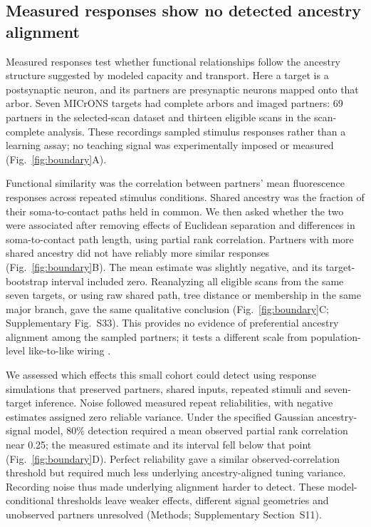 \documentclass[11pt]{article}
\begin{document}
\subsection*{Measured responses show no detected ancestry alignment}

Measured responses test whether functional relationships follow the ancestry structure suggested by modeled capacity and transport. Here a target is a postsynaptic neuron, and its partners are presynaptic neurons mapped onto that arbor. Seven MICrONS targets had complete arbors and imaged partners: 69 partners in the selected-scan dataset and thirteen eligible scans in the scan-complete analysis. These recordings sampled stimulus responses rather than a learning assay; no teaching signal was experimentally imposed or measured (Fig.~\ref{fig:boundary}A).

Functional similarity was the correlation between partners' mean fluorescence responses across repeated stimulus conditions. Shared ancestry was the fraction of their soma-to-contact paths held in common. We then asked whether the two were associated after removing effects of Euclidean separation and differences in soma-to-contact path length, using partial rank correlation. Partners with more shared ancestry did not have reliably more similar responses (Fig.~\ref{fig:boundary}B). The mean estimate was slightly negative, and its target-bootstrap interval included zero. Reanalyzing all eligible scans from the same seven targets, or using raw shared path, tree distance or membership in the same major branch, gave the same qualitative conclusion (Fig.~\ref{fig:boundary}C; Supplementary Fig.~S33). This provides no evidence of preferential ancestry alignment among the sampled partners; it tests a different scale from population-level like-to-like wiring \citep{ding2025wiring}.

We assessed which effects this small cohort could detect using response simulations that preserved partners, shared inputs, repeated stimuli and seven-target inference. Noise followed measured repeat reliabilities, with negative estimates assigned zero reliable variance. Under the specified Gaussian ancestry-signal model, 80\% detection required a mean observed partial rank correlation near 0.25; the measured estimate and its interval fell below that point (Fig.~\ref{fig:boundary}D). Perfect reliability gave a similar observed-correlation threshold but required much less underlying ancestry-aligned tuning variance. Recording noise thus made underlying alignment harder to detect. These model-conditional thresholds leave weaker effects, different signal geometries and unobserved partners unresolved (Methods; Supplementary Section~S11).
\end{document}
